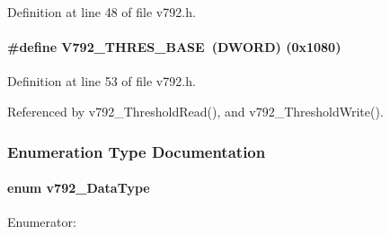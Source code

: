 Definition at line 48 of file v792.h.
\paragraph[{V792\_\-THRES\_\-BASE}]{\setlength{\rightskip}{0pt plus 5cm}\#define V792\_\-THRES\_\-BASE~({\bf DWORD}) (0x1080)}\hfill\label{v792_8h_a8043168be515a4d04ad42f41eac30b3b}


Definition at line 53 of file v792.h.

Referenced by v792\_\-ThresholdRead(), and v792\_\-ThresholdWrite().

\subsubsection{Enumeration Type Documentation}
\paragraph[{v792\_\-DataType}]{\setlength{\rightskip}{0pt plus 5cm}enum {\bf v792\_\-DataType}}\hfill\label{v792_8h_aef599012aab6cf12a98961feef0835a3}
\begin{Desc}
\item[Enumerator: ]\par
\begin{description}
\item[{\em 
v792\_\-typeMeasurement\label{v792_8h_aef599012aab6cf12a98961feef0835a3ae1d872049a1229c08c19f9a6cbb16bbe}
}]\item[{\em 
v792\_\-typeHeader\label{v792_8h_aef599012aab6cf12a98961feef0835a3adb636c7c45d5414ef99e2d937d6eb109}
}]\item[{\em 
v792\_\-typeFooter\label{v792_8h_aef599012aab6cf12a98961feef0835a3aea9a98936320b3d026da5d1125dfbb40}
}]\item[{\em 
v792\_\-typeFiller\label{v792_8h_aef599012aab6cf12a98961feef0835a3ab3247ad462cd0f1535d8a508941d4e20}
}]\end{description}
\end{Desc}



